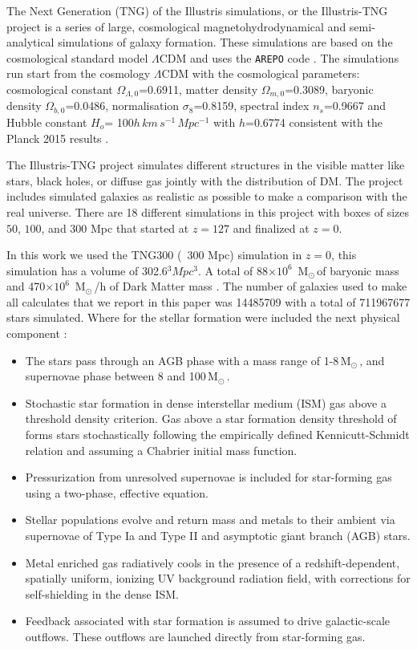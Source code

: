 \documentclass[usenatbib]{mnras}
\newcommand{\Msun}{\,{\rm M}$_{\odot}$\,}
\begin{document}
The Next Generation (TNG) of the Illustris simulations, or the
Illustris-TNG project \citep{Nelson2015} is a series of large,
cosmological magnetohydrodynamical and semi-analytical simulations of galaxy formation. 
These simulations are based on the cosmological standard model
$\Lambda$CDM and uses the \texttt{AREPO} code \cite{Springel2011}.  The simulations run start from the cosmology $\Lambda$CDM with the cosmological parameters: cosmological constant $\Omega_{\Lambda,0}$=0.6911, matter density $\Omega_{m,0}$=0.3089,  baryonic density $\Omega_{b,0}$=0.0486, normalisation $\sigma_8$=0.8159, spectral index $n_s$=0.9667 and Hubble constant $H_o$= 100$h\,km\,s^{-1}\,Mpc^{-1}$ with $h$=0.6774 consistent with the Planck 2015 results \cite{Ade2016}. 

The Illustris-TNG project simulates different structures in the visible matter like stars, black holes, or diffuse gas jointly with the distribution of DM.
The project includes simulated galaxies as realistic as possible to make a comparison with the real universe. There are 18 different simulations in this project with boxes of sizes $50$, $100$, and $300$ Mpc that started at $z=127$ and finalized at $z=0$.   

In this work we used the TNG300 (~300 Mpc) simulation in $z=0$, this simulation has a volume of 302.6$^3 Mpc^3$. 
A total of 88$\times 10^{6}$ \Msun of baryonic mass
and 470$\times 10^{6}$ \Msun/h of Dark Matter mass \cite{Nelson2015}. 
The number of galaxies used to make all calculates that we report in this paper
was 14485709 with a total of 711967677 stars simulated. Where for the stellar formation were included the next physical component \cite{Nelson2015, Pillepich2018a}:
\begin{itemize}
    \item The stars pass through an AGB phase with a mass range of 1-8\Msun, and supernovae phase between 8 and 100\Msun. 
    \item Stochastic star formation in dense interstellar medium (ISM) gas above a threshold density criterion. Gas above a star formation density threshold of forms stars stochastically following the empirically defined Kennicutt-Schmidt relation and assuming a Chabrier initial mass function.
    \item Pressurization from unresolved supernovae is included for star-forming gas using a two-phase, effective equation.
    \item Stellar populations evolve and return mass and metals to their ambient via supernovae of Type Ia and Type II and asymptotic giant branch (AGB) stars.
    \item Metal enriched gas radiatively cools in the presence of a redshift-dependent, spatially uniform, ionizing UV background radiation field, with corrections for self-shielding in the dense ISM.
    \item Feedback associated with star formation is assumed to drive galactic-scale outflows. These outflows are launched directly from star-forming gas.
\end{itemize}
\end{document}
